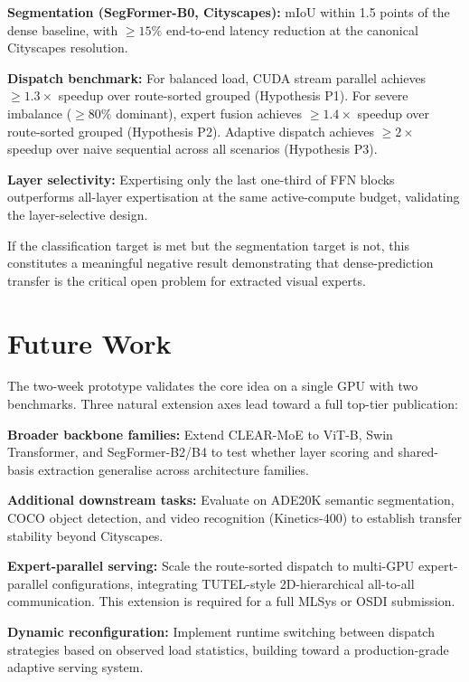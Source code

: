 \documentclass[conference]{IEEEtran}
\begin{document}
\textbf{Segmentation (SegFormer-B0, Cityscapes):} mIoU within 1.5 points of the dense baseline, with $\geq 15\%$ end-to-end latency reduction at the canonical Cityscapes resolution.

\textbf{Dispatch benchmark:} For balanced load, CUDA stream parallel achieves $\geq 1.3\times$ speedup over route-sorted grouped (Hypothesis P1). For severe imbalance ($\geq 80\%$ dominant), expert fusion achieves $\geq 1.4\times$ speedup over route-sorted grouped (Hypothesis P2). Adaptive dispatch achieves $\geq 2\times$ speedup over naive sequential across all scenarios (Hypothesis P3).

\textbf{Layer selectivity:} Expertising only the last one-third of FFN blocks outperforms all-layer expertisation at the same active-compute budget, validating the layer-selective design.

If the classification target is met but the segmentation target is not, this constitutes a meaningful negative result demonstrating that dense-prediction transfer is the critical open problem for extracted visual experts.

\section{Future Work}
\label{sec:future}

The two-week prototype validates the core idea on a single GPU with two benchmarks. Three natural extension axes lead toward a full top-tier publication:

\textbf{Broader backbone families:} Extend CLEAR-MoE to ViT-B, Swin Transformer, and SegFormer-B2/B4 to test whether layer scoring and shared-basis extraction generalise across architecture families.

\textbf{Additional downstream tasks:} Evaluate on ADE20K semantic segmentation, COCO object detection, and video recognition (Kinetics-400) to establish transfer stability beyond Cityscapes.

\textbf{Expert-parallel serving:} Scale the route-sorted dispatch to multi-GPU expert-parallel configurations, integrating TUTEL-style 2D-hierarchical all-to-all communication. This extension is required for a full MLSys or OSDI submission.

\textbf{Dynamic reconfiguration:} Implement runtime switching between dispatch strategies based on observed load statistics, building toward a production-grade adaptive serving system.
\end{document}
